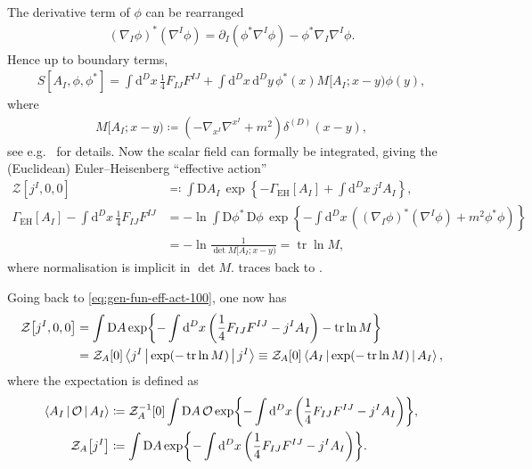 \documentclass[12pt]{article}
\newcommand\dif{\mathrm{d}}
\newcommand\Dif{\mathrm{D}}
\DeclareMathOperator{\tr}{tr}
\newcommand{\rbr}[1]{{\left(#1\right)}}
\newcommand{\rfun}[2]{{#1}\mathopen{}\left(#2\right)\mathclose{}}
\newcommand{\sfun}[2]{{#1}\mathopen{}\left[#2\right]\mathclose{}}
\newcommand{\cfun}[2]{{#1}\mathopen{}\left\{#2\right\}\mathclose{}}
\begin{document}
The derivative term of $\phi$ can be rearranged
\begin{align}
\rbr{\nabla_{\! I} \phi}^* \rbr{\nabla^{I} \phi} = \partial_I\rbr{\phi^* 
\nabla^{I}\phi} - \phi^* \nabla_{\! I} \nabla^{I} \phi.
\end{align}
Hence up to boundary terms,
\begin{align}
\sfun{S}{A_I, \phi, \phi^*} = \int \dif^D x\, \frac{1}{4} F_{IJ} F^{IJ} +
	\int \dif^D x\,\dif^D y\,
	\rfun{\phi^*}{x} M[A_I; x-y) \rfun{\phi}{y},
\end{align}
where
\begin{align}
M[A_I; x-y) \coloneqq \rbr{-\nabla_{\! x^I} \nabla^{x^I} + m^2} 
\rfun{\delta^{(D)}}{x-y},
\end{align}
see e.g.\ \cite[ch.\ 6]{mosel2004} for details. Now the scalar field can 
formally be integrated, giving the (Euclidean) Euler--Heisenberg ``effective 
action''
\begin{align}
\sfun{\mathcal{Z}}{j^I, 0, 0} &\eqqcolon
\int \Dif A_I\,\cfun{\exp}{-\sfun{\varGamma_\text{EH}}{A_I}
+ \int \dif^D x\,j^I A_I},
\\
\sfun{\varGamma_\text{EH}}{A_I} - \int\dif^{D} x\,
\frac{1}{4} F_{IJ} F^{IJ}
&=
-\ln \int \Dif\phi^*\,\Dif\phi\,
	\cfun{\exp}{-\int\dif^{D} x\, \rbr{
	\rbr{\nabla_{\! I} \phi}^* \rbr{\nabla^{I} \phi} + m^2 \phi^* \phi}}
\nonumber \\
&= -\ln \frac{1}{\det M[A_I; x-y)} = \tr \ln M,
\label{eq:gen-fun-eff-act-150}
\end{align}
where normalisation is implicit in $\det M$.  
traces 
back to \cite{heisenberg1936,weisskopf1936}.

Going back to \cref{eq:gen-fun-eff-act-100}, one now has
\begin{align}
\sfun{\mathcal{Z}}{j^I, 0, 0} &=
\int\Dif A\, \cfun{\exp}{-\int \dif^D x\,
\rbr{\frac{1}{4} F_{IJ} F^{IJ} - j^{I} A_{I}} - \tr\ln M}
\nonumber \\
&=
\sfun{\mathcal{Z}_{A}}{0}
	\Braket{j^I | \rfun{\exp}{-\tr\ln M} | j^I}
\equiv \sfun{\mathcal{Z}_{A}}{0}
	\Braket{A_I | \rfun{\exp}{-\tr\ln M} | A_I},
\label{eq:gen-fun-eff-act-200}
\end{align}
where the expectation is defined as
\begin{align}
\Braket{A_I | \mathcal{O} | A_I} &\coloneqq
	\sfun{\mathcal{Z}_{A}^{-1}}{0}
	\int\Dif A\, \mathcal{O}\,\cfun{\exp}{-\int \dif^D x\,
		\rbr{\frac{1}{4} F_{IJ} F^{IJ} - j^{I} A_{I}}},
\\
\sfun{\mathcal{Z}_{A}}{j^I} &\coloneqq
\int\Dif A\, \cfun{\exp}{-\int \dif^D x\,
\rbr{\frac{1}{4} F_{IJ} F^{IJ} - j^{I} A_{I}}}.
\end{align}
\end{document}
